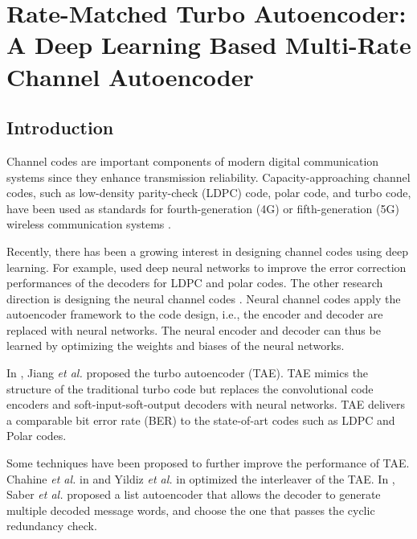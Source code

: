 \documentclass [PhD] {uclathes}
\begin{document}
\chapter{Rate-Matched Turbo Autoencoder: A Deep Learning Based Multi-Rate Channel Autoencoder}

\section{Introduction}
Channel codes  are important components of modern digital communication systems since they enhance transmission reliability. Capacity-approaching channel codes, such as low-density parity-check (LDPC) code\cite{gallager1962low}, polar code\cite{Arikan_polar}, and turbo code\cite{turbo}, have been used as standards for fourth-generation (4G) or fifth-generation (5G) wireless communication systems \cite{3gpp.36.212, 3gpp2017study}.

Recently, there has been a growing interest in designing channel codes using deep learning. For example, \cite{nachimain_ldpc_neural_decoder,wang_n2dnms,polar_neural_decoder} used deep neural networks to improve the error correction performances of the decoders for LDPC and polar codes.
The other research direction is designing the neural channel codes \cite{makkuva2021ko,chahine_tae_interleaver,clausius_strcutre_tae,jamali_productae,jiang_rnn_cae,saber_list_tae,jiang2019turbo,zhang2021design}. Neural channel codes apply the autoencoder framework \cite{vincent2008extracting} to the code design, i.e., the encoder and decoder are replaced with neural networks. The neural encoder and decoder can  thus be learned by optimizing the weights and biases of the neural networks. 

In \cite{jiang2019turbo}, Jiang \emph{et al.} proposed the turbo autoencoder (TAE). TAE mimics the structure of the traditional turbo code but replaces the convolutional code encoders and soft-input-soft-output decoders with neural networks. TAE delivers a comparable bit error rate (BER) to the state-of-art codes such as LDPC and Polar codes. 

Some techniques have been proposed to further improve the performance of TAE. Chahine \emph{et al.} in \cite{chahine_tae_interleaver} and Yildiz \emph{et al.} in \cite{TAE_interleaver} optimized the interleaver of the TAE. In \cite{saber_list_tae}, Saber \emph{et al.} proposed a list autoencoder that allows the decoder to generate multiple decoded message words, and choose the one that passes the cyclic redundancy check. 
\end{document}
